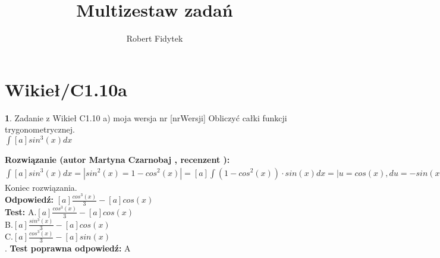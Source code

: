 \documentclass[12pt, a4paper]{article}
\title{Multizestaw zadań}
\author{Robert Fidytek}
\date{}
\theoremstyle{definition} %
\newtheorem{zad}{}
\newcommand{\kategoria}[1]{\section{#1}} %
\newcommand{\zadStart}[1]{\begin{zad}#1\newline} %
\newcommand{\zadStop}{\end{zad}}   %
\newcommand{\rozwStart}[2]{\noindent \textbf{Rozwiązanie (autor #1 , recenzent #2): }\newline} %
\newcommand{\rozwStop}{\newline}                                            %
\newcommand{\odpStart}{\noindent \textbf{Odpowiedź:}\newline}    %
\newcommand{\odpStop}{\newline}                                             %
\newcommand{\testStart}{\noindent \textbf{Test:}\newline} %
\newcommand{\testStop}{\newline} %
\newcommand{\kluczStart}{\noindent \textbf{Test poprawna odpowiedź:}\newline} %
\newcommand{\kluczStop}{\newline} %
\begin{document}
\maketitle


\kategoria{Wikieł/C1.10a}
\zadStart{Zadanie z Wikieł C1.10 a) moja wersja nr [nrWersji]}
Obliczyć całki funkcji trygonometrycznej.\\
$\int [a] sin^{3}(x) dx$\\
\zadStop
\rozwStart{Martyna Czarnobaj}{}
	$\int [a] sin^{3}(x) dx = | sin^{2}(x)=1-cos^{2}(x)| = [a] \int (1-cos^{2}(x)) \cdot sin(x) dx = |u=cos(x), du=-sin(x)dx| = [a] \int u^{2}-1 du = [a](\int u^{2} du - \int 1 du) = [a](\frac{u^{2+1}}{2+1} - u) = [a]\frac{u^{3}}{3} - [a]u = [a]\frac{cos^{3}(x)}{3} - [a]cos(x)$\\


Koniec rozwiązania.\\
\rozwStop
\odpStart
$ [a]\frac{cos^{3}(x)}{3} - [a]cos(x) $\\
\odpStop
\testStart
A.$ [a]\frac{cos^{3}(x)}{3} - [a]cos(x) $\\
B.$ [a]\frac{sin^{3}(x)}{3} - [a]cos(x) $\\
C.$ [a]\frac{cos^{3}(x)}{3} - [a]sin(x) $\\
.
\testStop
\kluczStart
A
\kluczStop
\end{document}
